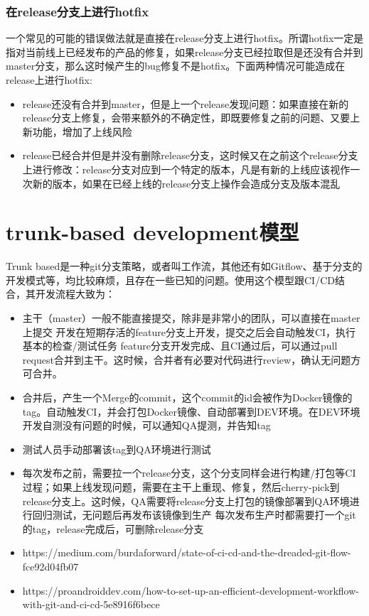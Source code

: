 \documentclass[12pt]{article}
\begin{document}
\subsubsection{在release分支上进行hotfix}\label{ux5728releaseux5206ux652fux4e0aux8fdbux884chotfix}

一个常见的可能的错误做法就是直接在release分支上进行hotfix。所谓hotfix一定是指对当前线上已经发布的产品的修复，如果release分支已经拉取但是还没有合并到master分支，那么这时候产生的bug修复不是hotfix。下面两种情况可能造成在release上进行hotfix:

\begin{itemize}
\tightlist
\item
  release还没有合并到master，但是上一个release发现问题：如果直接在新的release分支上修复，会带来额外的不确定性，即既要修复之前的问题、又要上新功能，增加了上线风险
\item
  release已经合并但是并没有删除release分支，这时候又在之前这个release分支上进行修改：release分支对应到一个特定的版本，凡是有新的上线应该视作一次新的版本，如果在已经上线的release分支上操作会造成分支及版本混乱
\end{itemize}

\section{trunk-based development模型}\label{trunk-based-developmentux6a21ux578b}

Trunk based是一种git分支策略，或者叫工作流，其他还有如Gitflow、基于分支的开发模式等，均比较麻烦，且存在一些已知的问题。使用这个模型跟CI/CD结合，其开发流程大致为：

\begin{itemize}
\tightlist
\item
  主干（master）一般不能直接提交，除非是非常小的团队，可以直接在master上提交 开发在短期存活的feature分支上开发，提交之后会自动触发CI，执行基本的检查/测试任务 feature分支开发完成、且CI通过后，可以通过pull request合并到主干。这时候，合并者有必要对代码进行review，确认无问题方可合并。
\item
  合并后，产生一个Merge的commit，这个commit的id会被作为Docker镜像的tag。自动触发CI，并会打包Docker镜像、自动部署到DEV环境。在DEV环境开发自测没有问题的时候，可以通知QA提测，并告知tag
\item
  测试人员手动部署该tag到QA环境进行测试
\item
  每次发布之前，需要拉一个release分支，这个分支同样会进行构建/打包等CI过程；如果上线发现问题，需要在主干上重现、修复，然后cherry-pick到release分支上。这时候，QA需要将release分支上打包的镜像部署到QA环境进行回归测试，无问题后再发布该镜像到生产 每次发布生产时都需要打一个git的tag，release完成后，可删除release分支
\end{itemize}

\pandocbounded{}

\begin{itemize}
\tightlist
\item
  https://medium.com/burdaforward/state-of-ci-cd-and-the-dreaded-git-flow-fce92d04fb07
\item
  https://proandroiddev.com/how-to-set-up-an-efficient-development-workflow-with-git-and-ci-cd-5e8916f6bece
\end{itemize}
\end{document}
